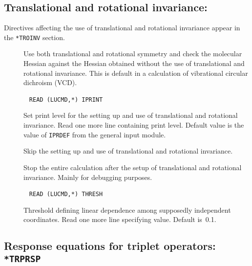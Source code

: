 \subsection{Translational and rotational invariance: 
}\label{sec:abatro}

Directives affecting the use of translational and rotational
invariance
appear in the \verb|*TROINV| section.
\begin{description}
\item[] Use both translational and
 rotational symmetry 
 and check the molecular Hessian against the Hessian obtained
without the use of translational and rotational invariance. This is
default in a calculation of vibrational circular dichroism
(VCD).

\item[]\verb| |\newline
\verb|READ (LUCMD,*) IPRINT|

Set print level for the setting up and use of translational and
rotational invariance.  Read one more line containing print
level. Default value is the value of \verb|IPRDEF| from the
general input module.

\item[] Skip the setting up and use of translational
and rotational invariance.

\item[] Stop the entire calculation after the setup of
translational and rotational invariance. Mainly for debugging purposes.

\item[]\verb| |\newline
\verb|READ (LUCMD,*) THRESH|

Threshold defining linear dependence among
supposedly independent coordinates.  Read one more line specifying
value.  Default is~0.1.
\end{description}

\subsection{Response equations for triplet operators: {\tt
*TRPRSP}}\label{sec:trprsp}

